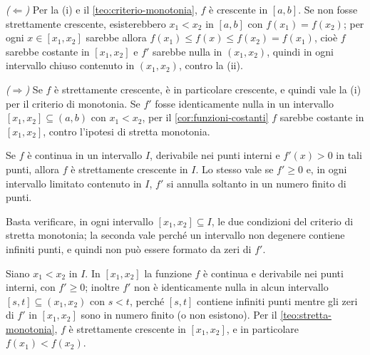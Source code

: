 \begin{dimostrazione}
\emph{($\Leftarrow$)} Per la (i) e il \cref{teo:criterio-monotonia}, $f$ è crescente in
$[a,b]$. Se non fosse strettamente crescente, esisterebbero $x_{1}<x_{2}$ in $[a,b]$
con $f(x_{1})=f(x_{2})$; per ogni $x\in[x_{1},x_{2}]$ sarebbe allora
$f(x_{1})\le f(x)\le f(x_{2})=f(x_{1})$, cioè $f$ sarebbe costante in $[x_{1},x_{2}]$ e
$f'$ sarebbe nulla in $(x_{1},x_{2})$, quindi in ogni intervallo chiuso contenuto in
$(x_{1},x_{2})$, contro la (ii).

\emph{($\Rightarrow$)} Se $f$ è strettamente crescente, è in particolare crescente, e
quindi vale la (i) per il criterio di monotonia. Se $f'$ fosse identicamente nulla in
un intervallo $[x_{1},x_{2}]\subseteq(a,b)$ con $x_{1}<x_{2}$, per il
\cref{cor:funzioni-costanti} $f$ sarebbe costante in $[x_{1},x_{2}]$, contro l'ipotesi
di stretta monotonia.
\end{dimostrazione}

\begin{corollario}\label{cor:derivata-positiva}
Se $f$ è continua in un intervallo $I$, derivabile nei punti interni e $f'(x)>0$ in tali
punti, allora $f$ è strettamente crescente in $I$. Lo stesso vale se $f'\ge0$ e, in ogni
intervallo limitato contenuto in $I$, $f'$ si annulla soltanto in un numero finito di
punti.
\end{corollario}

\begin{schema}
\end{schema}

\begin{strategia}
Basta verificare, in ogni intervallo $[x_{1},x_{2}]\subseteq I$, le due condizioni del
criterio di stretta monotonia; la seconda vale perché un intervallo non degenere
contiene infiniti punti, e quindi non può essere formato da zeri di $f'$.
\end{strategia}

\begin{dimostrazione}
Siano $x_{1}<x_{2}$ in $I$. In $[x_{1},x_{2}]$ la funzione $f$ è continua e derivabile
nei punti interni, con $f'\ge0$; inoltre $f'$ non è identicamente nulla in alcun
intervallo $[s,t]\subseteq(x_{1},x_{2})$ con $s<t$, perché $[s,t]$ contiene infiniti punti
mentre gli zeri di $f'$ in $[x_{1},x_{2}]$ sono in numero finito (o non esistono). Per il
\cref{teo:stretta-monotonia}, $f$ è strettamente crescente in $[x_{1},x_{2}]$, e in
particolare $f(x_{1})<f(x_{2})$.
\end{dimostrazione}

